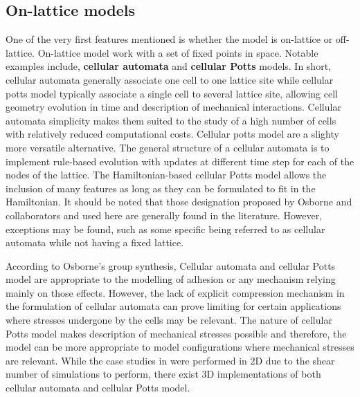 \documentclass[11pt,a4paper]{article}
\begin{document}
\subsection{On-lattice models}
One of the very first features mentioned is whether the model is on-lattice or off-lattice. On-lattice model work with a set of fixed points in space. Notable examples include, \textbf{cellular automata} and \textbf{cellular Potts} models. In short, cellular automata generally associate one cell to one lattice site while cellular potts model typically associate a single cell to several lattice site, allowing cell geometry evolution in time and description of mechanical interactions. Cellular automata simplicity makes them suited to the study of a high number of cells with relatively reduced computational costs. Cellular potts model are a slighty more versatile alternative. The general structure of a cellular automata is to implement rule-based evolution with updates at different time step for each of the nodes of the lattice. The Hamiltonian-based cellular Potts model allows the inclusion of many features as long as they can be formulated to fit in the Hamiltonian. It should be noted that those designation proposed by Osborne and collaborators and used here are generally found in the literature. However, exceptions may be found, such as some specific being referred to as cellular automata while not having a fixed lattice.\cite{Adenis2020}

According to Osborne's group synthesis, Cellular automata and cellular Potts model are appropriate to the modelling of adhesion or any mechanism relying mainly on those effects. However, the lack of explicit compression mechanism in the formulation of cellular automata can prove limiting for certain applications where stresses undergone by the cells may be relevant. The nature of cellular Potts model makes description of mechanical stresses possible and therefore, the model can be more appropriate to model configurations where mechanical stresses are relevant. While the case studies in \cite{Osborne2017} were performed in 2D due to the shear number of simulations to perform, there exist 3D implementations of both cellular automata and cellular Potts model.
\end{document}
